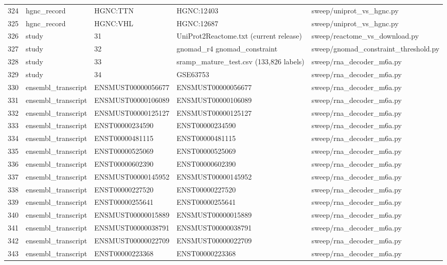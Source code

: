 {\begin{longtable}{rllp{3.2cm}p{4.2cm}}
324 & hgnc\_record & HGNC:TTN & HGNC:12403 & sweep/uniprot\_vs\_hgnc.py\\
325 & hgnc\_record & HGNC:VHL & HGNC:12687 & sweep/uniprot\_vs\_hgnc.py\\
326 & study & 31 & UniProt2Reactome.txt (current release) & sweep/reactome\_vs\_download.py\\
327 & study & 32 & gnomad\_r4 gnomad\_constraint & sweep/gnomad\_constraint\_threshold.py\\
328 & study & 33 & sramp\_mature\_test.csv (133,826 labels) & sweep/rna\_decoder\_m6a.py\\
329 & study & 34 & GSE63753 & sweep/rna\_decoder\_m6a.py\\
330 & ensembl\_transcript & ENSMUST00000056677 & ENSMUST00000056677 & sweep/rna\_decoder\_m6a.py\\
331 & ensembl\_transcript & ENSMUST00000106089 & ENSMUST00000106089 & sweep/rna\_decoder\_m6a.py\\
332 & ensembl\_transcript & ENSMUST00000125127 & ENSMUST00000125127 & sweep/rna\_decoder\_m6a.py\\
333 & ensembl\_transcript & ENST00000234590 & ENST00000234590 & sweep/rna\_decoder\_m6a.py\\
334 & ensembl\_transcript & ENST00000481115 & ENST00000481115 & sweep/rna\_decoder\_m6a.py\\
335 & ensembl\_transcript & ENST00000525069 & ENST00000525069 & sweep/rna\_decoder\_m6a.py\\
336 & ensembl\_transcript & ENST00000602390 & ENST00000602390 & sweep/rna\_decoder\_m6a.py\\
337 & ensembl\_transcript & ENSMUST00000145952 & ENSMUST00000145952 & sweep/rna\_decoder\_m6a.py\\
338 & ensembl\_transcript & ENST00000227520 & ENST00000227520 & sweep/rna\_decoder\_m6a.py\\
339 & ensembl\_transcript & ENST00000255641 & ENST00000255641 & sweep/rna\_decoder\_m6a.py\\
340 & ensembl\_transcript & ENSMUST00000015889 & ENSMUST00000015889 & sweep/rna\_decoder\_m6a.py\\
341 & ensembl\_transcript & ENSMUST00000038791 & ENSMUST00000038791 & sweep/rna\_decoder\_m6a.py\\
342 & ensembl\_transcript & ENSMUST00000022709 & ENSMUST00000022709 & sweep/rna\_decoder\_m6a.py\\
343 & ensembl\_transcript & ENST00000223368 & ENST00000223368 & sweep/rna\_decoder\_m6a.py\\

\end{longtable}}
